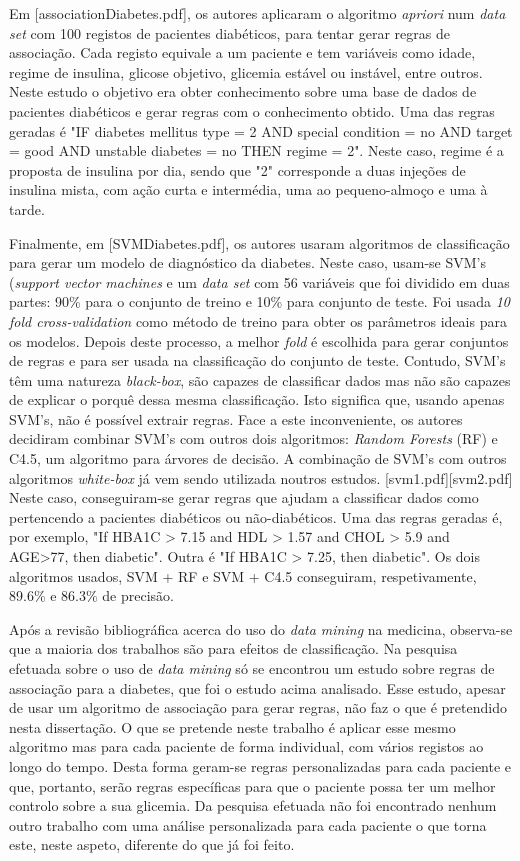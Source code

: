 Em [associationDiabetes.pdf], os autores aplicaram o algoritmo \textit{apriori} num \textit{data set} com 100 registos de pacientes diabéticos, para tentar gerar regras de associação. Cada registo equivale a um paciente e tem variáveis como idade, regime de insulina, glicose objetivo, glicemia estável ou instável, entre outros. 
Neste estudo o objetivo era obter conhecimento sobre uma base de dados de pacientes diabéticos e gerar regras com o conhecimento obtido.
Uma das regras geradas é "IF diabetes mellitus type = 2 AND special condition = no AND target = good AND unstable diabetes = no THEN regime = 2". Neste caso, regime é a proposta de insulina por dia, sendo que "2" corresponde a duas injeções de insulina mista, com ação curta e intermédia, uma ao pequeno-almoço e uma à tarde. 

Finalmente, em [SVMDiabetes.pdf], os autores usaram algoritmos de classificação para gerar um modelo de diagnóstico da diabetes. Neste caso, usam-se SVM's (\textit{support vector machines} e um \textit{data set} com 56 variáveis que foi dividido em duas partes: 90\% para o conjunto de treino e 10\% para conjunto de teste. Foi usada \textit{10 fold cross-validation} como método de treino para obter os parâmetros ideais para os modelos. Depois deste processo, a melhor \textit{fold} é escolhida para gerar conjuntos de regras e para ser usada na classificação do conjunto de teste. Contudo, SVM's têm uma natureza \textit{black-box}, são capazes de classificar dados mas não são capazes de explicar o porquê dessa mesma classificação. Isto significa que, usando apenas SVM's, não é possível extrair regras. Face a este inconveniente, os autores decidiram combinar SVM's com outros dois algoritmos: \textit{Random Forests} (RF) e C4.5, um algoritmo para árvores de decisão. A combinação de SVM's com outros algoritmos \textit{white-box} já vem sendo utilizada noutros estudos. [svm1.pdf][svm2.pdf] Neste caso, conseguiram-se gerar regras que ajudam a classificar dados como pertencendo a pacientes diabéticos ou não-diabéticos. Uma das regras geradas é, por exemplo,  "If HBA1C > 7.15 and HDL > 1.57 and CHOL > 5.9 and AGE>77, then diabetic". 
Outra é "If HBA1C > 7.25, then diabetic". Os dois algoritmos usados, SVM + RF e SVM + C4.5 conseguiram, respetivamente, 89.6\% e 86.3\% de precisão.

Após a revisão bibliográfica acerca do uso do \textit{data mining} na medicina, observa-se que a maioria dos trabalhos são para efeitos de classificação. Na pesquisa efetuada sobre o uso de \textit{data mining} só se encontrou um estudo sobre regras de associação para a diabetes, que foi o estudo acima analisado. Esse estudo, apesar de usar um algoritmo de associação para gerar regras, não faz o que é pretendido nesta dissertação. 
O que se pretende neste trabalho é aplicar esse mesmo algoritmo mas para cada paciente de forma individual, com vários registos ao longo do tempo. Desta forma geram-se regras personalizadas para cada paciente e que, portanto, serão regras específicas para que o paciente possa ter um melhor controlo sobre a sua glicemia. Da pesquisa efetuada não foi encontrado nenhum outro trabalho com uma análise personalizada para cada paciente o que torna este, neste aspeto, diferente do que já foi feito.

